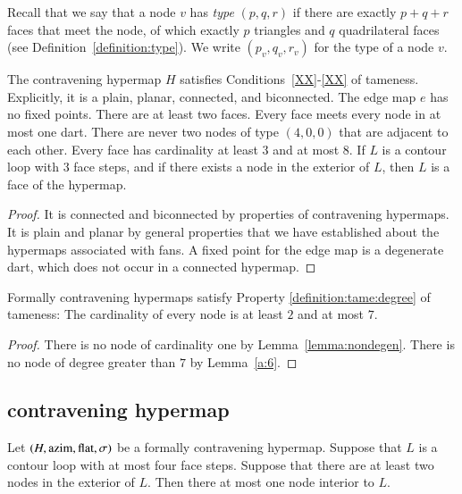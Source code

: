 \begin{lemma}
\begin{lemma}
Recall that we say that a node $v$ has {\it type\/} $(p,q,r)$ if
there are exactly $p+q+r$ faces that meet the node, of which exactly
$p$ triangles and $q$ quadrilateral faces (see
Definition~\ref{definition:type}).  We write $(p_v,q_v,r_v)$ for the
type of a node $v$.

\begin{lemma} The contravening hypermap $H$ satisfies Conditions~\ref{XX}-\ref{XX} 
of tameness.
Explicitly, it is a plain, planar, connected, and biconnected. 
The edge map $e$
has no fixed points. There are at least two faces. Every face meets
every node in at most one dart.  There are never two nodes of type
$(4,0,0)$ that are adjacent to each other.  Every face has
cardinality at least $3$ and at most $8$.  If $L$ is a contour loop
with $3$ face steps, and if there exists a node in the exterior of
$L$, then $L$ is a face of the hypermap.
\end{lemma}

\begin{proof}
It is connected and biconnected by properties of contravening hypermaps.
It is plain and planar by general properties that we have established
about the hypermaps associated with fans.
A fixed point for the edge map is a degenerate dart, which does not occur in a connected hypermap.
\end{proof}


\begin{lemma} 
Formally contravening hypermaps satisfy Property
\ref{definition:tame:degree} of tameness: The cardinality of every
node is at least $2$ and at most $7$.
\end{lemma}

\begin{proof}  There is no node of cardinality one by
Lemma~\ref{lemma:nondegen}.  There is no node of degree
greater than $7$ by Lemma~\ref{a:6}.
\end{proof}


\subsection{contravening hypermap}





\begin{lemma}\label{lemma:no-2}
Let $(H,{\operatorname{azim}},\operatorname{flat},\sigma)$ be a formally contravening hypermap.
Suppose that $L$ is a contour loop with at most four face steps.
Suppose that there are at least two nodes in the exterior of $L$.
Then there at most one node interior to $L$.
\end{lemma}



\end{lemma}
\end{lemma}

